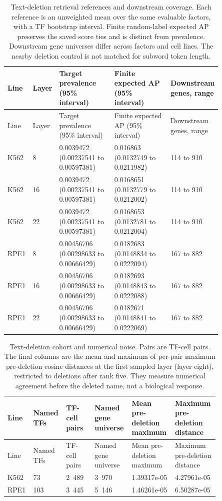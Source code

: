 \begin{longtable}{@{}L{0.08\linewidth}L{0.06\linewidth}L{0.27\linewidth}L{0.29\linewidth}L{0.15\linewidth}@{}}
\caption{Text-deletion retrieval references and downstream coverage. Each reference is an unweighted mean over the same evaluable factors, with a TF bootstrap interval. Finite random-label expected AP preserves the saved score ties and is distinct from prevalence. Downstream gene universes differ across factors and cell lines. The nearby deletion control is not matched for subword token length.}\\
\toprule
Line & Layer & Target prevalence (95\% interval) & Finite expected AP (95\% interval) & Downstream genes, range \\
\midrule
\endfirsthead
\toprule
Line & Layer & Target prevalence (95\% interval) & Finite expected AP (95\% interval) & Downstream genes, range \\
\midrule
\endhead
\endfoot
\bottomrule
\endlastfoot
K562 & 8 & 0.0039472 (0.00237541 to 0.00597381) & 0.016863 (0.0132749 to 0.0211982) & 114 to 910 \\
K562 & 16 & 0.0039472 (0.00237541 to 0.00597381) & 0.0168651 (0.0132779 to 0.0212002) & 114 to 910 \\
K562 & 22 & 0.0039472 (0.00237541 to 0.00597381) & 0.0168653 (0.0132781 to 0.0212004) & 114 to 910 \\
RPE1 & 8 & 0.00456706 (0.00298633 to 0.00666429) & 0.0182683 (0.0148834 to 0.0222094) & 167 to 882 \\
RPE1 & 16 & 0.00456706 (0.00298633 to 0.00666429) & 0.0182693 (0.0148843 to 0.0222088) & 167 to 882 \\
RPE1 & 22 & 0.00456706 (0.00298633 to 0.00666429) & 0.0182671 (0.0148841 to 0.0222069) & 167 to 882 \\
\end{longtable}
\begin{longtable}{@{}L{0.08\linewidth}L{0.1\linewidth}L{0.13\linewidth}L{0.14\linewidth}L{0.19\linewidth}L{0.2\linewidth}@{}}
\caption{Text-deletion cohort and numerical noise. Pairs are TF-cell pairs. The final columns are the mean and maximum of per-pair maximum pre-deletion cosine distances at the first sampled layer (layer eight), restricted to deletions after rank five. They measure numerical agreement before the deleted name, not a biological response.}\\
\toprule
Line & Named TFs & TF-cell pairs & Named gene universe & Mean pre-deletion maximum & Maximum pre-deletion distance \\
\midrule
\endfirsthead
\toprule
Line & Named TFs & TF-cell pairs & Named gene universe & Mean pre-deletion maximum & Maximum pre-deletion distance \\
\midrule
\endhead
\endfoot
\bottomrule
\endlastfoot
K562 & 73 & 2~489 & 3~970 & \mbox{1.39317e-05} & \mbox{4.27961e-05} \\
RPE1 & 103 & 3~445 & 5~146 & \mbox{1.46261e-05} & \mbox{6.50287e-05} \\
\end{longtable}
